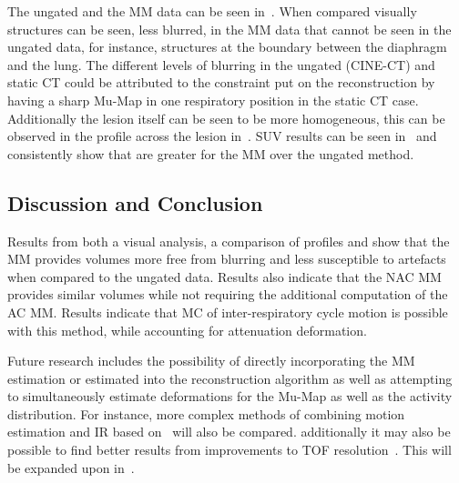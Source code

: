              The ungated and the \gls{MM} data can be seen in~. When compared visually structures can be seen, less blurred, in the \gls{MM} data that cannot be seen in the ungated data, for instance, structures at the boundary between the diaphragm and the lung. The different levels of blurring in the ungated (CINE-\gls{CT}) and static \gls{CT} could be attributed to the constraint put on the reconstruction by having a sharp \gls{Mu-Map} in one respiratory position in the static \gls{CT} case. Additionally the lesion itself can be seen to be more homogeneous, this can be observed in the profile across the lesion in~. \gls{SUV} results can be seen in~ and consistently show that  are greater for the \gls{MM} over the ungated method.
            
        \subsection{Discussion and Conclusion} \label{sec:pet_ct_respiratory_motion_correction_with_a_single_attenuation_map_using_nac_derived_deformation_fields_discussion_and_conclusion}
            Results from both a visual analysis, a comparison of profiles and  show that the \gls{MM} provides volumes more free from blurring and less susceptible to artefacts when compared to the ungated data. Results also indicate that the \gls{NAC} \gls{MM} provides similar volumes while not requiring the additional computation of the \gls{AC} \gls{MM}. Results indicate that \gls{MC} of inter-respiratory cycle motion is possible with this method, while accounting for attenuation deformation.
            
            Future research includes the possibility of directly incorporating the \gls{MM} estimation or estimated  into the reconstruction algorithm as well as  attempting to simultaneously estimate deformations for the \gls{Mu-Map} as well as the activity distribution. For instance, more complex methods of combining motion estimation and \gls{IR} based on~ will also be compared. additionally it may also be possible to find better results from improvements to \gls{TOF} resolution~\cite{Efthimiou2020UseScanners, Efthimiou2020TOF-PETBGO}. This will be expanded upon in~.
    
